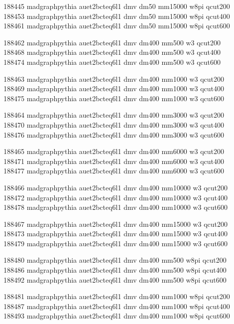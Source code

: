 188445 madgraphpythia auet2bcteq6l1 dmv dm50 mm15000 w8pi qcut200\\
188453 madgraphpythia auet2bcteq6l1 dmv dm50 mm15000 w8pi qcut400\\
188461 madgraphpythia auet2bcteq6l1 dmv dm50 mm15000 w8pi qcut600

188462 madgraphpythia auet2bcteq6l1 dmv dm400 mm500 w3 qcut200\\
188468 madgraphpythia auet2bcteq6l1 dmv dm400 mm500 w3 qcut400\\
188474 madgraphpythia auet2bcteq6l1 dmv dm400 mm500 w3 qcut600

188463 madgraphpythia auet2bcteq6l1 dmv dm400 mm1000 w3 qcut200\\
188469 madgraphpythia auet2bcteq6l1 dmv dm400 mm1000 w3 qcut400\\
188475 madgraphpythia auet2bcteq6l1 dmv dm400 mm1000 w3 qcut600

188464 madgraphpythia auet2bcteq6l1 dmv dm400 mm3000 w3 qcut200\\
188470 madgraphpythia auet2bcteq6l1 dmv dm400 mm3000 w3 qcut400\\
188476 madgraphpythia auet2bcteq6l1 dmv dm400 mm3000 w3 qcut600

188465 madgraphpythia auet2bcteq6l1 dmv dm400 mm6000 w3 qcut200\\
188471 madgraphpythia auet2bcteq6l1 dmv dm400 mm6000 w3 qcut400\\
188477 madgraphpythia auet2bcteq6l1 dmv dm400 mm6000 w3 qcut600

188466 madgraphpythia auet2bcteq6l1 dmv dm400 mm10000 w3 qcut200\\
188472 madgraphpythia auet2bcteq6l1 dmv dm400 mm10000 w3 qcut400\\
188478 madgraphpythia auet2bcteq6l1 dmv dm400 mm10000 w3 qcut600

188467 madgraphpythia auet2bcteq6l1 dmv dm400 mm15000 w3 qcut200\\
188473 madgraphpythia auet2bcteq6l1 dmv dm400 mm15000 w3 qcut400\\
188479 madgraphpythia auet2bcteq6l1 dmv dm400 mm15000 w3 qcut600

188480 madgraphpythia auet2bcteq6l1 dmv dm400 mm500 w8pi qcut200\\
188486 madgraphpythia auet2bcteq6l1 dmv dm400 mm500 w8pi qcut400\\
188492 madgraphpythia auet2bcteq6l1 dmv dm400 mm500 w8pi qcut600

188481 madgraphpythia auet2bcteq6l1 dmv dm400 mm1000 w8pi qcut200\\
188487 madgraphpythia auet2bcteq6l1 dmv dm400 mm1000 w8pi qcut400\\
188493 madgraphpythia auet2bcteq6l1 dmv dm400 mm1000 w8pi qcut600

